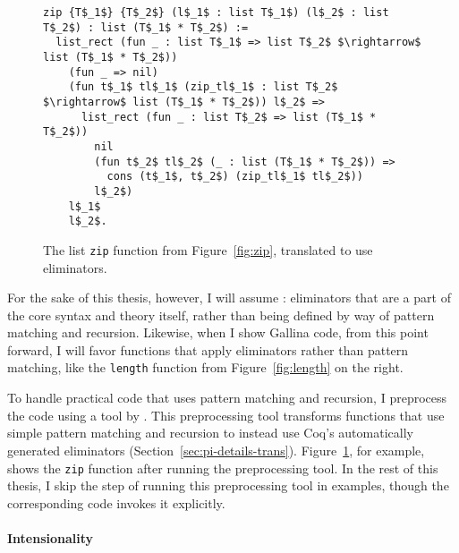 \begin{figure}
\begin{lstlisting}
zip {T$_1$} {T$_2$} (l$_1$ : list T$_1$) (l$_2$ : list T$_2$) : list (T$_1$ * T$_2$) :=
  list_rect (fun _ : list T$_1$ => list T$_2$ $\rightarrow$ list (T$_1$ * T$_2$))
    (fun _ => nil)
    (fun t$_1$ tl$_1$ (zip_tl$_1$ : list T$_2$ $\rightarrow$ list (T$_1$ * T$_2$)) l$_2$ =>
      list_rect (fun _ : list T$_2$ => list (T$_1$ * T$_2$))
        nil
        (fun t$_2$ tl$_2$ (_ : list (T$_1$ * T$_2$)) =>
          cons (t$_1$, t$_2$) (zip_tl$_1$ tl$_2$))
        l$_2$)
    l$_1$
    l$_2$.
\end{lstlisting}
\caption{The list \lstinline{zip} function from Figure~\ref{fig:zip}, translated to use eliminators.}
\label{fig:zip-elim}
\end{figure}

For the sake of this thesis, however, I will assume : eliminators that are a part of the core syntax and theory itself,
rather than being defined by way of pattern matching and recursion.
Likewise, when I show Gallina code, from this point forward, I will favor functions that apply eliminators rather than pattern matching, like the \lstinline{length} function from Figure~\ref{fig:length}
on the right.

To handle practical code that uses pattern matching and recursion,
I preprocess the code using a tool by .
This preprocessing tool transforms functions that use simple pattern matching and recursion
to instead use Coq's automatically generated eliminators (Section~\ref{sec:pi-details-trans}).
Figure~\ref{fig:zip-elim}, for example, shows the \lstinline{zip} function after running the preprocessing tool.
In the rest of this thesis, I skip the step of running this preprocessing tool in examples,
though the corresponding code invokes it explicitly.

\paragraph{Intensionality}

